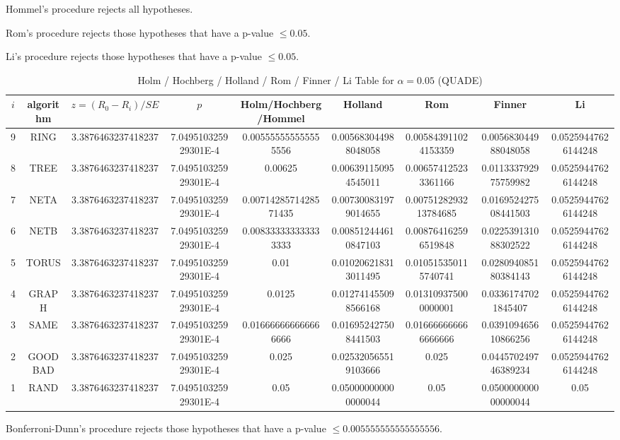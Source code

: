 \documentclass[a4paper,10pt]{article}
\begin{document}
\begin{landscape}
Hommel's procedure rejects all hypotheses.


Rom's procedure rejects those hypotheses that have a p-value $\le0.05$.


Li's procedure rejects those hypotheses that have a p-value $\le0.05$.



\newpage

\begin{table}[!htp]
\centering\scriptsize
\caption{Holm / Hochberg / Holland / Rom / Finner / Li Table for $\alpha=0.05$ (QUADE)}
\begin{tabular}{ccccccccc}
$i$&algorithm&$z=(R_0 - R_i)/SE$&$p$&Holm/Hochberg/Hommel&Holland&Rom&Finner&Li\\
\hline
9& RING&3.3876463237418237&7.049510325929301E-4&0.005555555555555556&0.005683044988048058&0.005843911024153359&0.005683044988048058&0.05259447626144248\\
8& TREE&3.3876463237418237&7.049510325929301E-4&0.00625&0.006391150954545011&0.006574125233361166&0.011333792975759982&0.05259447626144248\\
7& NETA&3.3876463237418237&7.049510325929301E-4&0.0071428571428571435&0.007300831979014655&0.0075128293213784685&0.016952427508441503&0.05259447626144248\\
6& NETB&3.3876463237418237&7.049510325929301E-4&0.008333333333333333&0.008512444610847103&0.008764162596519848&0.022539131088302522&0.05259447626144248\\
5& TORUS&3.3876463237418237&7.049510325929301E-4&0.01&0.010206218313011495&0.010515350115740741&0.028094085180384143&0.05259447626144248\\
4& GRAPH&3.3876463237418237&7.049510325929301E-4&0.0125&0.012741455098566168&0.013109375000000001&0.03361747021845407&0.05259447626144248\\
3& SAME&3.3876463237418237&7.049510325929301E-4&0.016666666666666666&0.016952427508441503&0.016666666666666666&0.039109465610866256&0.05259447626144248\\
2& GOODBAD&3.3876463237418237&7.049510325929301E-4&0.025&0.025320565519103666&0.025&0.044570249746389234&0.05259447626144248\\
1& RAND&3.3876463237418237&7.049510325929301E-4&0.05&0.050000000000000044&0.05&0.050000000000000044&0.05\\
\hline
\end{tabular}
\end{table}
Bonferroni-Dunn's procedure rejects those hypotheses that have a p-value $\le0.005555555555555556$.



\end{landscape}
\end{document}
